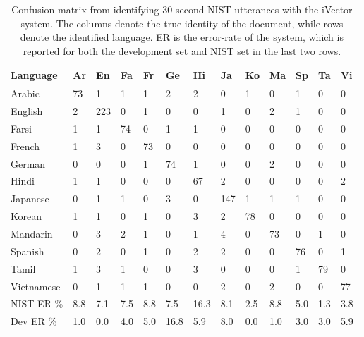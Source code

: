 \begin{table}[hbt!]
\begin{tabular}{| l | p{4.5mm} | p{4.5mm} | p{4.5mm} | p{4.5mm} | p{4.5mm} | p{4.5mm} | p{4.5mm} | p{4.5mm} | p{4.5mm} | p{4.5mm} | p{4.5mm} | p{4.5mm} |}
\hline
Language &Ar & En & Fa & Fr & Ge & Hi & Ja & Ko & Ma & Sp & Ta & Vi \\
\hline
Arabic       & 73 & 1 & 1 & 1 & 2 & 2 & 0 & 1 & 0 & 1 & 0 & 0 \\
English      & 2 & 223 & 0 & 1 & 0 & 0 & 1 & 0 & 2 & 1 & 0 & 0\\
Farsi          & 1 & 1 & 74 & 0 & 1 & 1 & 0 & 0 & 0 & 0 & 0 & 0\\
French       & 1 & 3 & 0 & 73 & 0 & 0 & 0 & 0 & 0 & 0 & 0 & 0\\
German     & 0 & 0 & 0 & 1 & 74 & 1 & 0 & 0 & 2 & 0 & 0 & 0\\
Hindi          & 1 & 1 & 0 & 0 & 0 & 67 & 2 & 0 & 0 & 0 & 0 & 2\\
Japanese   & 0 & 1 & 1 & 0 & 3 & 0 & 147 & 1 & 1 & 1 & 0 & 0\\
Korean       & 1 & 1 & 0 & 1 & 0 & 3 & 2 & 78 & 0 & 0 & 0 & 0\\
Mandarin    & 0 & 3 & 2 & 1 & 0 & 1 & 4 & 0 & 73 & 0 & 1 & 0\\
Spanish       & 0 & 2 & 0 & 1 & 0 & 2 & 2 & 0 & 0 & 76 & 0 & 1\\
Tamil           & 1 & 3 & 1 & 0 & 0 & 3 & 0 & 0 & 0 & 1 & 79 & 0\\
Vietnamese & 0 & 1 & 1 & 1 & 0 & 0 & 2 & 0 & 2 & 0 & 0 & 77\\
\hline
NIST ER \%& 8.8 & 7.1 & 7.5 & 8.8 &  7.5 & 16.3 & 8.1 & 2.5 & 8.8 & 5.0 & 1.3 & 3.8 \\
\hline
Dev ER \% & 1.0 & 0.0 & 4.0 & 5.0 & 16.8 &  5.9 & 8.0 & 0.0 & 1.0 & 3.0 & 3.0 & 5.9 \\
\hline
\end{tabular}
\caption{Confusion matrix from identifying 30 second NIST utterances with the iVector system. The columns denote the true identity of the document, while rows denote the identified language. ER is the error-rate of the system, which is reported for both the development set and NIST set in the last two rows.}
\label{ivectidresults}
\end{table}


